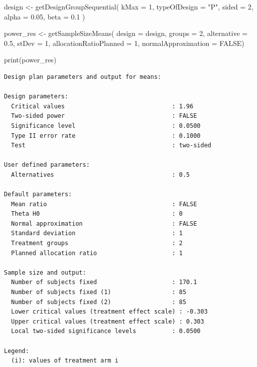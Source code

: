 \documentclass[
  letterpaper,
  DIV=11,
  numbers=noendperiod]{scrreprt}
\newenvironment{Shaded}{\begin{snugshade}}{\end{snugshade}}
\newcommand{\AttributeTok}[1]{\textcolor[rgb]{0.40,0.45,0.13}{#1}}
\newcommand{\ConstantTok}[1]{\textcolor[rgb]{0.56,0.35,0.01}{#1}}
\newcommand{\DecValTok}[1]{\textcolor[rgb]{0.68,0.00,0.00}{#1}}
\newcommand{\FloatTok}[1]{\textcolor[rgb]{0.68,0.00,0.00}{#1}}
\newcommand{\FunctionTok}[1]{\textcolor[rgb]{0.28,0.35,0.67}{#1}}
\newcommand{\NormalTok}[1]{\textcolor[rgb]{0.00,0.23,0.31}{#1}}
\newcommand{\OtherTok}[1]{\textcolor[rgb]{0.00,0.23,0.31}{#1}}
\newcommand{\StringTok}[1]{\textcolor[rgb]{0.13,0.47,0.30}{#1}}
\begin{document}
\begin{Shaded}
\begin{Highlighting}[]
\NormalTok{design }\OtherTok{\textless{}{-}} \FunctionTok{getDesignGroupSequential}\NormalTok{(}
  \AttributeTok{kMax =} \DecValTok{1}\NormalTok{,}
  \AttributeTok{typeOfDesign =} \StringTok{"P"}\NormalTok{,}
  \AttributeTok{sided =} \DecValTok{2}\NormalTok{,}
  \AttributeTok{alpha =} \FloatTok{0.05}\NormalTok{,}
  \AttributeTok{beta =} \FloatTok{0.1}
\NormalTok{)}

\NormalTok{power\_res }\OtherTok{\textless{}{-}} \FunctionTok{getSampleSizeMeans}\NormalTok{(}
  \AttributeTok{design =}\NormalTok{ design,}
  \AttributeTok{groups =} \DecValTok{2}\NormalTok{,}
  \AttributeTok{alternative =} \FloatTok{0.5}\NormalTok{, }
  \AttributeTok{stDev =} \DecValTok{1}\NormalTok{, }
  \AttributeTok{allocationRatioPlanned =} \DecValTok{1}\NormalTok{,}
  \AttributeTok{normalApproximation =} \ConstantTok{FALSE}\NormalTok{)}

\FunctionTok{print}\NormalTok{(power\_res)}
\end{Highlighting}
\end{Shaded}

\begin{verbatim}
Design plan parameters and output for means:

Design parameters:
  Critical values                              : 1.96 
  Two-sided power                              : FALSE 
  Significance level                           : 0.0500 
  Type II error rate                           : 0.1000 
  Test                                         : two-sided 

User defined parameters:
  Alternatives                                 : 0.5 

Default parameters:
  Mean ratio                                   : FALSE 
  Theta H0                                     : 0 
  Normal approximation                         : FALSE 
  Standard deviation                           : 1 
  Treatment groups                             : 2 
  Planned allocation ratio                     : 1 

Sample size and output:
  Number of subjects fixed                     : 170.1 
  Number of subjects fixed (1)                 : 85 
  Number of subjects fixed (2)                 : 85 
  Lower critical values (treatment effect scale) : -0.303 
  Upper critical values (treatment effect scale) : 0.303 
  Local two-sided significance levels          : 0.0500 

Legend:
  (i): values of treatment arm i
\end{verbatim}
\end{document}
